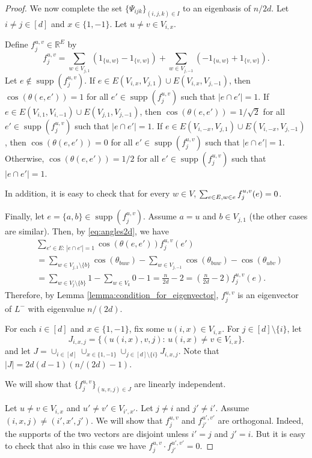 \documentclass[a4paper,11pt]{article}
\theoremstyle{plain}
\theoremstyle{definition}
\newcommand{\Rea}{{\mathbb R}}
\DeclareMathOperator{\supp}{\text{supp}}
\begin{document}
\begin{proof}
We now complete the set $\{\Psi_{i j k}\}_{(i,j,k)\in I}$ to an eigenbasis of $n/2d$.
Let $i\neq j \in[d]$ and $x\in\{1,-1\}$. Let $u\neq v\in V_{i,x}$.

Define $f_{j}^{u,v}\in \Rea^E$ by
\[
    f_{j}^{u,v}= \sum_{w\in V_{j,1}} (1_{\{u,w\}}-1_{\{v,w\}})+\sum_{w\in V_{j,-1}} (-1_{\{u,w\}}+1_{\{v,w\}}).
\]
Let $e\notin \supp(f_j^{u,v})$.
If $e\in E(V_{i,x},V_{j,1})\cup E(V_{i,x},V_{j,-1})$, then $\cos(\theta(e,e'))=1$ for all $e'\in \supp(f_j^{u,v})$ such that $|e\cap e'|=1$. If $e\in E(V_{i,1},V_{i,-1})\cup E(V_{j,1},V_{j,-1})$, then $\cos(\theta(e,e'))=1/\sqrt{2}$ for all $e'\in \supp(f_j^{u,v})$ such that $|e\cap e'|=1$. If $e\in E(V_{i,-x},V_{j,1})\cup E(V_{i,-x},V_{j,-1})$, then $\cos(\theta(e,e'))=0$ for all $e'\in \supp(f_j^{u,v})$ such that $|e\cap e'|=1$. Otherwise, $\cos(\theta(e,e'))=1/2$ for all $e'\in \supp(f_j^{u,v})$ such that $|e\cap e'|=1$.

In addition, it is easy to check that for every $w\in V$, $\sum_{e\in E,\\ w\in e} f^{u,v}_j(e)=0$.

Finally, let $e=\{a,b\}\in\supp(f_j^{u,v})$. Assume $a=u$ and $b\in V_{j,1}$ (the other cases are similar). Then, by \eqref{eq:angles2d}, we have
\begin{align*}
        &\sum_{e'\in E:\, |e\cap e'|=1} \cos(\theta(e,e')) f_j^{u,v}(e')
        \\&=\sum_{w\in V_{j,1}\setminus\{b\}} \cos(\theta_{b u w}) - \sum_{w\in V_{j,-1}}\cos(\theta_{b u w}) - \cos(\theta_{u b v})
        \\
        &=\sum_{w\in V_j\setminus\{b\}} 1  -\sum_{w\in V_k} 0 -1 = \frac{n}{2d}-2=\left(\frac{n}{2d}-2\right)f_j^{u,v}(e).
        \end{align*}
Therefore, by Lemma \ref{lemma:condition_for_eigenvector}, $f_j^{u,v}$ is an eigenvector of $L^{-}$ with eigenvalue $n/(2d)$.

For each $i\in [d]$ and $x\in\{1,-1\}$, fix some $u(i,x)\in V_{i,x}$. 
For $j\in[d]\setminus\{i\}$, let
\[
J_{i,x,j}=\{ (u(i,x),v,j):\, u(i,x)\neq v\in V_{i,x}\}.
\]
and let $J=\cup_{i\in[d]}\cup_{x\in\{1,-1\}}\cup_{j\in [d]\setminus \{i\}} J_{i,x,j}$. Note that $|J|=2d(d-1)(n/(2d)-1)$.

We will show that $\{f_j^{u,v}\}_{(u,v,j)\in J}$ are linearly independent.

Let $u\neq v\in V_{i,x}$ and $u'\neq v'\in V_{i',x'}$. Let $j\neq i$ and $j'\neq i'$.
Assume $(i,x,j)\neq (i',x',j')$.
We will show that $f_{j}^{u,v}$ and $f_{j'}^{u',v'}$ are orthogonal. Indeed, the supports of the two vectors are disjoint unless $i'=j$ and $j'=i$. But it is easy to check that also in this case we have $f_{j}^{u,v}\cdot f_{j'}^{u',v'}=0$.


\end{proof}
\end{document}

